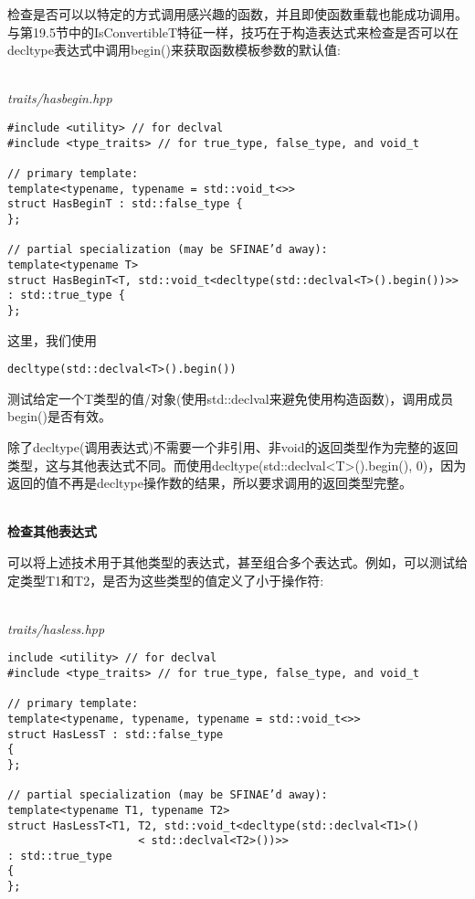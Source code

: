 检查是否可以以特定的方式调用感兴趣的函数，并且即使函数重载也能成功调用。与第19.5节中的IsConvertibleT特征一样，技巧在于构造表达式来检查是否可以在decltype表达式中调用begin()来获取函数模板参数的默认值:

\hspace*{\fill} \\ %
\noindent
\textit{traits/hasbegin.hpp}
\begin{lstlisting}[style=styleCXX]
#include <utility> // for declval
#include <type_traits> // for true_type, false_type, and void_t

// primary template:
template<typename, typename = std::void_t<>>
struct HasBeginT : std::false_type {
};

// partial specialization (may be SFINAE’d away):
template<typename T>
struct HasBeginT<T, std::void_t<decltype(std::declval<T>().begin())>>
: std::true_type {
};
\end{lstlisting}

这里，我们使用

\begin{lstlisting}[style=styleCXX]
decltype(std::declval<T>().begin())
\end{lstlisting}

测试给定一个T类型的值/对象(使用std::declval来避免使用构造函数)，调用成员begin()是否有效。

\begin{tcolorbox}[colback=webgreen!5!white,colframe=webgreen!75!black]
\hspace*{0.75cm}除了decltype(调用表达式)不需要一个非引用、非void的返回类型作为完整的返回类型，这与其他表达式不同。而使用decltype(std::declval<T>().begin(), 0)，因为返回的值不再是decltype操作数的结果，所以要求调用的返回类型完整。
\end{tcolorbox}

\hspace*{\fill} \\ %
\noindent
\textbf{检查其他表达式}

可以将上述技术用于其他类型的表达式，甚至组合多个表达式。例如，可以测试给定类型T1和T2，是否为这些类型的值定义了小于操作符:

\hspace*{\fill} \\ %
\noindent
\textit{traits/hasless.hpp}
\begin{lstlisting}[style=styleCXX]
include <utility> // for declval
#include <type_traits> // for true_type, false_type, and void_t

// primary template:
template<typename, typename, typename = std::void_t<>>
struct HasLessT : std::false_type
{
};

// partial specialization (may be SFINAE’d away):
template<typename T1, typename T2>
struct HasLessT<T1, T2, std::void_t<decltype(std::declval<T1>()
					< std::declval<T2>())>>
: std::true_type
{
};
\end{lstlisting}

